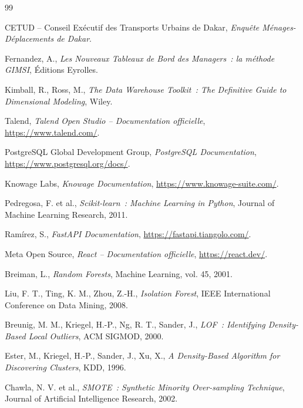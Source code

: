 \begin{thebibliography}{99}

 CETUD -- Conseil Exécutif des Transports Urbains de Dakar, \emph{Enquête Ménages-Déplacements de Dakar}.

 Fernandez, A., \emph{Les Nouveaux Tableaux de Bord des Managers~: la méthode GIMSI}, Éditions Eyrolles.

 Kimball, R., Ross, M., \emph{The Data Warehouse Toolkit~: The Definitive Guide to Dimensional Modeling}, Wiley.

 Talend, \emph{Talend Open Studio -- Documentation officielle}, \url{https://www.talend.com/}.

 PostgreSQL Global Development Group, \emph{PostgreSQL Documentation}, \url{https://www.postgresql.org/docs/}.

 Knowage Labs, \emph{Knowage Documentation}, \url{https://www.knowage-suite.com/}.

 Pedregosa, F. et al., \emph{Scikit-learn~: Machine Learning in Python}, Journal of Machine Learning Research, 2011.

 Ramírez, S., \emph{FastAPI Documentation}, \url{https://fastapi.tiangolo.com/}.

 Meta Open Source, \emph{React -- Documentation officielle}, \url{https://react.dev/}.

 Breiman, L., \emph{Random Forests}, Machine Learning, vol. 45, 2001.

 Liu, F. T., Ting, K. M., Zhou, Z.-H., \emph{Isolation Forest}, IEEE International Conference on Data Mining, 2008.

 Breunig, M. M., Kriegel, H.-P., Ng, R. T., Sander, J., \emph{LOF~: Identifying Density-Based Local Outliers}, ACM SIGMOD, 2000.

 Ester, M., Kriegel, H.-P., Sander, J., Xu, X., \emph{A Density-Based Algorithm for Discovering Clusters}, KDD, 1996.

 Chawla, N. V. et al., \emph{SMOTE~: Synthetic Minority Over-sampling Technique}, Journal of Artificial Intelligence Research, 2002.

\end{thebibliography}
